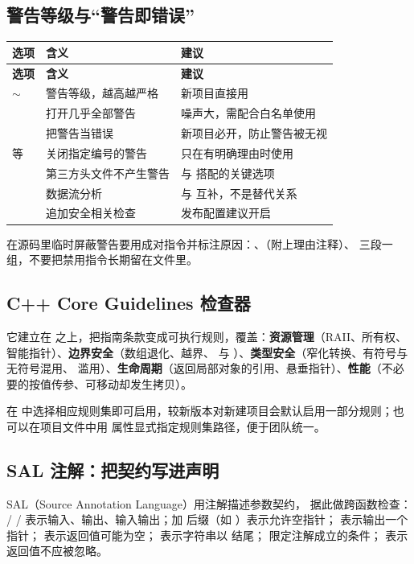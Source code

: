 \subsection{警告等级与“警告即错误”}
\begin{longtable}{L{3.2cm}L{4.6cm}L{6.8cm}}
\toprule \textbf{选项} & \textbf{含义} & \textbf{建议} \\ \midrule
\endfirsthead
\toprule \textbf{选项} & \textbf{含义} & \textbf{建议} \\ \midrule
\endhead
\bottomrule \endlastfoot
{} $\sim$  & 警告等级，越高越严格 & 新项目直接用  \\
 & 打开几乎全部警告 & 噪声大，需配合白名单使用 \\
 & 把警告当错误 & 新项目必开，防止警告被无视 \\
 等 & 关闭指定编号的警告 & 只在有明确理由时使用 \\
 & 第三方头文件不产生警告 & 与  搭配的关键选项 \\
 & 数据流分析 & 与  互补，不是替代关系 \\
 & 追加安全相关检查 & 发布配置建议开启 \\
\end{longtable}

在源码里临时屏蔽警告要用成对指令并标注原因：、（附上理由注释）、 三段一组，不要把禁用指令长期留在文件里。

\subsection{C++ Core Guidelines 检查器}
它建立在  之上，把指南条款变成可执行规则，覆盖：\textbf{资源管理}（RAII、所有权、智能指针）、\textbf{边界安全}（数组退化、越界、 与 ）、\textbf{类型安全}（窄化转换、有符号与无符号混用、 滥用）、\textbf{生命周期}（返回局部对象的引用、悬垂指针）、\textbf{性能}（不必要的按值传参、可移动却发生拷贝）。

在  中选择相应规则集即可启用，较新版本对新建项目会默认启用一部分规则；也可以在项目文件中用  属性显式指定规则集路径，便于团队统一。

\subsection{SAL 注解：把契约写进声明}
SAL（Source Annotation Language）用注解描述参数契约， 据此做跨函数检查： /  /  表示输入、输出、输入输出；加  后缀（如 ）表示允许空指针； 表示输出一个指针； 表示返回值可能为空； 表示字符串以 \code{\0} 结尾； 限定注解成立的条件； 表示返回值不应被忽略。

